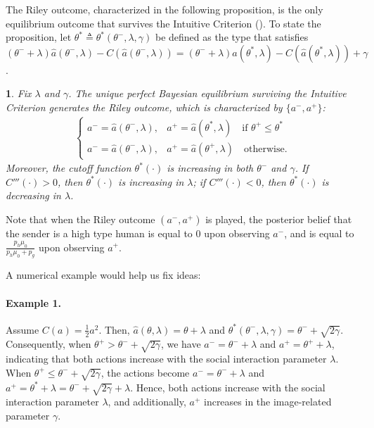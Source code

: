 \documentclass[english,12pt]{article}
\theoremstyle{plain}
\theoremstyle{plain}
\theoremstyle{definition}
\theoremstyle{definition}
\theoremstyle{assumption}
\theoremstyle{plain}
\theoremstyle{plain}
\theoremstyle{plain}
\newtheorem{proposition}{\protect\propositionname}
\theoremstyle{plain}
\theoremstyle{definition}%
\theoremstyle{plain}
\theoremstyle{plain}
\theoremstyle{plain}
\theoremstyle{plain}
\theoremstyle{plain}
\providecommand{\propositionname}{Proposition}
\begin{document}
The Riley outcome, characterized in the following proposition, is the only equilibrium outcome that survives the Intuitive Criterion (\citealt{ChoKreps:87}). To state the proposition, let $\theta^*\triangleq\theta^*(\theta^-,\lambda,\gamma)$ be defined as the type that satisfies $(\theta^-+\lambda)\hat{a}(\theta^-,\lambda) - C(\hat{a}(\theta^-,\lambda)) = (\theta^-+\lambda)\hat{a}(\theta^*,\lambda) - C(\hat{a}(\theta^*,\lambda)) + \gamma$.



\begin{proposition}\label{prop:riley_outcome}
    Fix $\lambda$ and $\gamma$. The unique perfect Bayesian equilibrium surviving the Intuitive Criterion generates the Riley outcome, which is characterized by $\{a^-,a^+\}$:
    \begin{align*}
    \begin{cases}
        a^- = \hat{a}(\theta^-,\lambda), &a^+ =\hat{a}(\theta^*,\lambda) \quad\text{if } \theta^+\leq \theta^*\\
        a^- =\hat{a}(\theta^-,\lambda), & a^+ = \hat{a}(\theta^+,\lambda) \quad\text{otherwise.}
    \end{cases}
    \end{align*}
    Moreover, the cutoff function $\theta^*(\cdot)$ is increasing in both $\theta^-$ and $\gamma$. If $C'''(\cdot)>0$, then $\theta^*(\cdot)$ is increasing in $\lambda$; if $C'''(\cdot)<0$, then $\theta^*(\cdot)$ is decreasing in $\lambda$.
\end{proposition}

Note that when the Riley outcome $(a^-,a^+)$ is played, the posterior belief that the sender is a high type human is equal to $0$ upon observing $a^-$, and is equal to $\frac{p_h\mu_0}{p_h\mu_0+p_g}$ upon observing $a^+$.


A numerical example would help us fix ideas:

\paragraph{Example 1.} Assume $C(a) = \frac{1}{2}a^2$. Then, $\hat{a}(\theta,\lambda) = \theta+\lambda$ and $\theta^*(\theta^-,\lambda,\gamma) = \theta^-+\sqrt{2\gamma}$. Consequently, when $\theta^+> \theta^-+\sqrt{2\gamma}$, we have $a^-=\theta^-+\lambda$ and $a^+=\theta^++\lambda$, indicating that both actions increase with the social interaction parameter $\lambda$. When $\theta^+\leq \theta^-+\sqrt{2\gamma}$, the actions become $a^-=\theta^-+\lambda$ and $a^+=\theta^*+\lambda = \theta^-+\sqrt{2\gamma}+\lambda$. Hence, both actions increase with the social interaction parameter $\lambda$, and additionally, $a^+$ increases in the image-related parameter $\gamma$.
\end{document}
